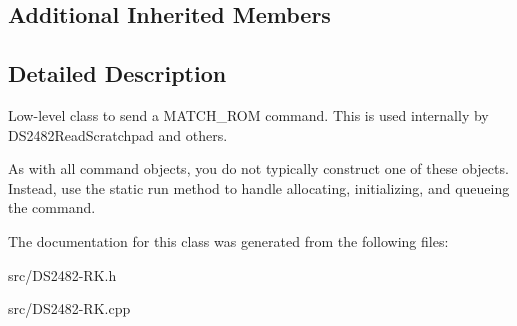 \subsection*{Additional Inherited Members}


\subsection{Detailed Description}
Low-\/level class to send a M\+A\+T\+C\+H\+\_\+\+R\+OM command. This is used internally by D\+S2482\+Read\+Scratchpad and others. 

As with all command objects, you do not typically construct one of these objects. Instead, use the static run method to handle allocating, initializing, and queueing the command. 

The documentation for this class was generated from the following files\+:\begin{DoxyCompactItemize}
\item 
src/D\+S2482-\/\+R\+K.\+h\item 
src/D\+S2482-\/\+R\+K.\+cpp\end{DoxyCompactItemize}
